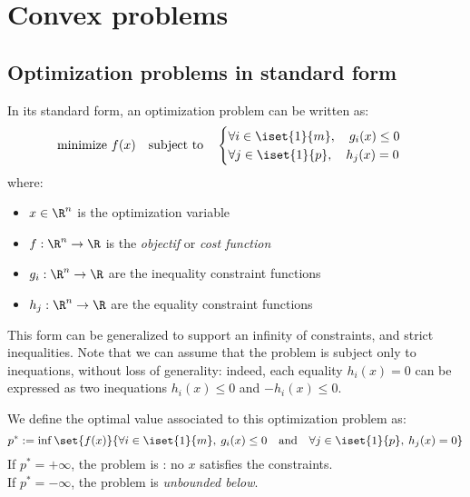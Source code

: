 \section{Convex problems}
\subsection{Optimization problems in standard form}
\begin{definition}
    In its standard form, an optimization problem can be written as:
    \begin{equation*}
        \text{minimize } f(x) \quad\text{subject to}\quad \begin{cases}
            \forall i\in\iset{1}{m}, \quad g_i(x)\leq 0\\
            \forall j\in\iset{1}{p}, \quad h_j(x) = 0
        \end{cases}
    \end{equation*}
    where:
    \begin{itemize}
        \item $x\in\R^n$ is the optimization variable
        \item $f:\R^n\to\R$ is the \emph{objectif} or \emph{cost function}
        \item $g_i:\R^n\to\R$ are the inequality constraint functions
        \item $h_j:\R^n\to\R$ are the equality constraint functions
    \end{itemize}
\end{definition}
\begin{remark}
    This form can be generalized to support an infinity of constraints, and strict inequalities. Note that we can assume that the problem is subject only to inequations, without loss of generality: indeed, each equality $h_i(x)=0$ can be expressed as two inequations $h_i(x)\leq0$ and $-h_i(x)\leq0$.
\end{remark}

\begin{definition}
    We define the optimal value associated to this optimization problem as:
    \begin{equation*}
        p^* := \inf\set{f(x)}{\forall i\in\iset{1}{m}, \: g_i(x)\leq 0 \quad\text{and}\quad \forall j\in\iset{1}{p}, \: h_j(x) = 0}
    \end{equation*}
    If $p^*=+\infty$, the problem is : no $x$ satisfies the constraints.\\
    If $p^*=-\infty$, the problem is \emph{unbounded below}.
\end{definition}

